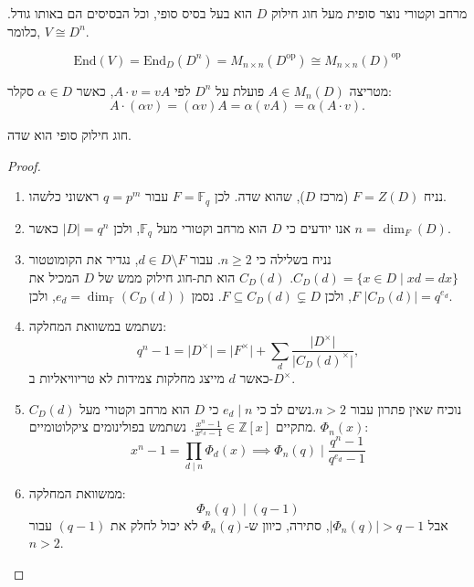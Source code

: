 \documentclass{tstextbook}
\begin{document}
\begin{definition}
מרחב וקטורי נוצר סופית מעל חוג חילוק \(D\) הוא בעל בסיס סופי, וכל הבסיסים הם באותו גודל. כלומר, \(V \cong D^n\).

\end{definition}
\begin{proposition}
$$\mathrm{End}(V) = \mathrm{End}_D(D^n) = M_{n \times n}(D^{\mathrm{op}}) \cong M_{n \times n}(D)^{\mathrm{op}}$$

\end{proposition}
מטריצה \(A \in M_n(D)\) פועלת על \(D^n\) לפי \(A \cdot v = vA\), כאשר \(\alpha \in D\) סקלר:
$$A \cdot (\alpha v) = (\alpha v)A = \alpha(vA) = \alpha(A \cdot v).$$

\begin{proposition}
חוג חילוק סופי הוא שדה.

\end{proposition}
\begin{proof}
  \begin{enumerate}
    \item נניח \(F = Z(D)\) (מרכז \(D\)), שהוא שדה. לכן \(F = \mathbb{F}_q\) עבור \(q = p^m\) ראשוני כלשהו. 


    \item אנו יודעים כי \(D\) הוא מרחב וקטורי מעל \(\mathbb{F}_q\), ולכן \(\lvert D \rvert = q^n\) כאשר \(n = \dim_F(D)\). 


    \item נניח בשלילה כי \(n \geq 2\). עבור \(d \in D \setminus F\), נגדיר את הקומוטטור \(C_D(d) = \{x \in D \mid xd = dx\}\). \(C_D(d)\) הוא תת-חוג חילוק ממש של \(D\) המכיל את \(F\), ולכן \(F \subseteq C_D(d) \subsetneq D\). נסמן \(e_d = \dim_{\mathbb{F}}(C_D(d))\), ולכן \(\lvert C_D(d) \rvert = q^{e_d}\). 


    \item נשתמש במשוואת המחלקה: 
$$q^n - 1 = \lvert D^\times \rvert = \lvert F^\times \rvert + \sum_d \frac{\lvert D^\times \rvert}{\lvert C_D(d)^\times \rvert},$$
כאשר \(d\) מייצג מחלקות צמידות לא טריוויאליות ב-\(D^\times\).


    \item נוכיח שאין פתרון עבור \(n > 2\).נשים לב כי \(e_d \mid n\) כי \(D\) הוא מרחב וקטורי מעל \(C_D(d)\).מתקיים \(\frac{x^n - 1}{x^{e_d} - 1} \in \mathbb{Z}[x]\). 
נשתמש בפולינומים ציקלוטומיים \(\Phi_n(x)\):
      $$x^n - 1 = \prod_{d \mid n} \Phi_d(x)\implies\Phi_n(q) \mid \frac{q^n - 1}{q^{e_d} - 1}$$


    \item ממשוואת המחלקה: 
$$\Phi_n(q) \mid (q - 1)$$
אבל \(\lvert \Phi_n(q) \rvert > q - 1\), סתירה, כיוון ש-\(\Phi_n(q)\) לא יכול לחלק את \((q - 1)\) עבור \(n > 2\).


  \end{enumerate}
\end{proof}
\end{document}
